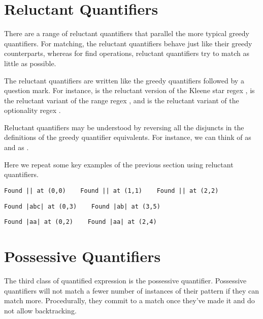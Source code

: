 \section{Reluctant Quantifiers}

There are a range of reluctant quantifiers that parallel the more
typical greedy quantifiers.  For matching, the reluctant quantifiers
behave just like their greedy counterparts, whereas for find
operations, reluctant quantifiers try to match as little as possible.

The reluctant quantifiers are written like the greedy quantifiers
followed by a question mark.  For instance,   is
the reluctant version of the Kleene star regex ,
 is the reluctant variant of the range regex
, and  is the reluctant
variant of the optionality regex .

Reluctant quantifiers may be understood by reversing all the disjuncts
in the definitions of the greedy quantifier equivalents.  For
instance, we can think of  as
 and  as
. 

Here we repeat some key examples of the previous section using reluctant
quantifiers.
%
\begin{verbatim}
Found || at (0,0)    Found || at (1,1)    Found || at (2,2)
\end{verbatim}
%
\begin{verbatim}
Found |abc| at (0,3)    Found |ab| at (3,5)
\end{verbatim}
%
\begin{verbatim}
Found |aa| at (0,2)    Found |aa| at (2,4)
\end{verbatim}
%


\section{Possessive Quantifiers}

The third class of quantified expression is the possessive quantifier.
Possessive quantifiers will not match a fewer number of instances of
their pattern if they can match more.  Procedurally, they commit to
a match once they've made it and do not allow backtracking.

